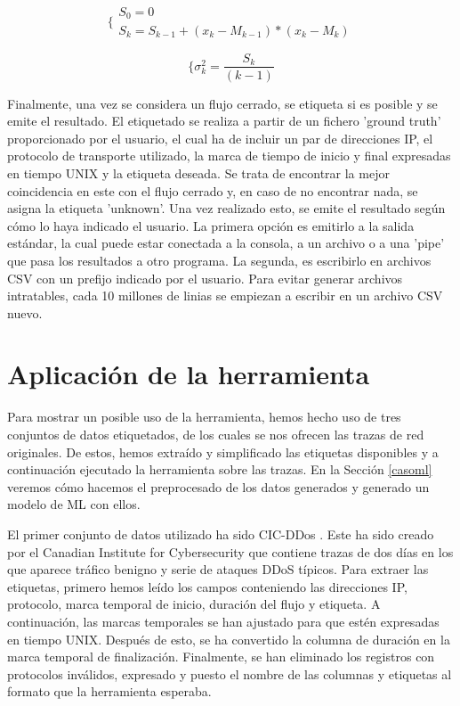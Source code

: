 \documentclass[10pt,a4paper,twoside]{article}
\begin{document}
\begin{multicols*}{2}
    \begin{equation} \label{eq:sqrrec}
    \biggl\{
        \begin{array}{l}
            S_{0} = 0 \\
            S_{k} = S_{k-1} + ( x_{k} - M_{k-1} ) * ( x_{k} - M_{k} )
        \end{array}      
    \end{equation}
    
    \begin{equation} \label{eq:variancereq}
    \biggl\{
        \sigma^2_{k} = {\frac{S_{k}}{(k - 1)}}
    \end{equation}

    Finalmente, una vez se considera un flujo cerrado, se etiqueta si es posible y se emite el resultado. El etiquetado se realiza a partir de un fichero 'ground truth' proporcionado por el usuario, el cual ha de incluir un par de direcciones IP, el protocolo de transporte utilizado, la marca de tiempo de inicio y final expresadas en tiempo UNIX y la etiqueta deseada. Se trata de encontrar la mejor coincidencia en este con el flujo cerrado y, en caso de no encontrar nada, se asigna la etiqueta 'unknown'. Una vez realizado esto, se emite el resultado según cómo lo haya indicado el usuario. La primera opción es emitirlo a la salida estándar, la cual puede estar conectada a la consola, a un archivo o a una 'pipe' que pasa los resultados a otro programa. La segunda, es escribirlo en archivos CSV con un prefijo indicado por el usuario. Para evitar generar archivos intratables, cada 10 millones de linias se empiezan a escribir en un archivo CSV nuevo.

    \section{Aplicación de la herramienta} \label{casoexec}

    Para mostrar un posible uso de la herramienta, hemos hecho uso de tres conjuntos de datos etiquetados, de los cuales se nos ofrecen las trazas de red originales. De estos, hemos extraído y simplificado las etiquetas disponibles y a continuación ejecutado la herramienta sobre las trazas. En la Sección \ref{casoml} veremos cómo hacemos el preprocesado de los datos generados y generado un modelo de ML con ellos.

    El primer conjunto de datos utilizado ha sido CIC-DDos \cite{8888419}. Este ha sido creado por el Canadian Institute for Cybersecurity que contiene trazas de dos días en los que aparece tráfico benigno y serie de ataques DDoS típicos. Para extraer las etiquetas, primero hemos leído los campos conteniendo las direcciones IP, protocolo, marca temporal de inicio, duración del flujo y etiqueta. A continuación, las marcas temporales se han ajustado para que estén expresadas en tiempo UNIX. Después de esto, se ha convertido la columna de duración en la marca temporal de finalización. Finalmente, se han eliminado los registros con protocolos inválidos, expresado y puesto el nombre de las columnas y etiquetas al formato que la herramienta esperaba.
    

\end{multicols*}
\end{document}
